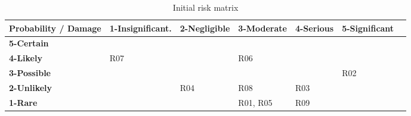 \begin{table}[H]
  \centering
  \scriptsize
  \begin{tabular}{|m{27mm}|m{24mm}|m{20mm}|m{20mm}|m{20mm}|m{20mm}|@{}m{0pt}@{}}
    \hline
    \bf Probability / Damage
  & \bf 1-Insignificant.
  & \bf 2-Negligible
  & \bf 3-Moderate
  & \bf 4-Serious
  & \bf 5-Significant
  & \\ [10pt]
    \hline
    \bf 5-Certain 
  & \cellcolor{yellow!50}
  & \cellcolor{yellow!50}
  & \cellcolor{orange!50}
  & \cellcolor{red!50}
  & \cellcolor{red!50}
  & \\ [10pt]
    \bf 4-Likely
  & \cellcolor{green!50} R07
  & \cellcolor{yellow!50}
  & \cellcolor{yellow!50} R06
  & \cellcolor{orange!50}
  & \cellcolor{red!50}
  & \\ [10pt]
    \bf 3-Possible
  & \cellcolor{green!50}
  & \cellcolor{green!50}
  & \cellcolor{yellow!50}
  & \cellcolor{yellow!50}
  & \cellcolor{orange!50} R02
  & \\ [10pt]
    \bf 2-Unlikely
  & \cellcolor{green!50}
  & \cellcolor{green!50} R04
  & \cellcolor{green!50} R08
  & \cellcolor{yellow!50} R03
  & \cellcolor{yellow!50}
  & \\ [10pt]
    \bf 1-Rare
  & \cellcolor{green!50}
  & \cellcolor{green!50}
  & \cellcolor{green!50} R01, R05
  & \cellcolor{green!50} R09
  & \cellcolor{green!50}
  & \\ [10pt]
    \hline
  \end{tabular} \\
  \caption{Initial risk matrix}
\end{table}

